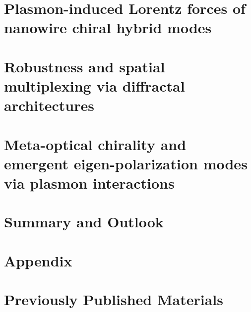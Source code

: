 \documentclass[letterpaper, 12pt, oneside]{book}
\begin{document}
\chapter{Plasmon-induced Lorentz forces of nanowire chiral hybrid modes}

\clearpage

\chapter{Robustness and spatial multiplexing via diffractal architectures}

\clearpage

\chapter{Meta-optical chirality and emergent eigen-polarization modes via plasmon interactions}

\clearpage

\chapter{Summary and Outlook}


\chapter{Appendix}


\chapter*{Previously Published Materials}
\label{chap:ppm}



\clearpage
\clearpage


\singlespacing


\end{document}
